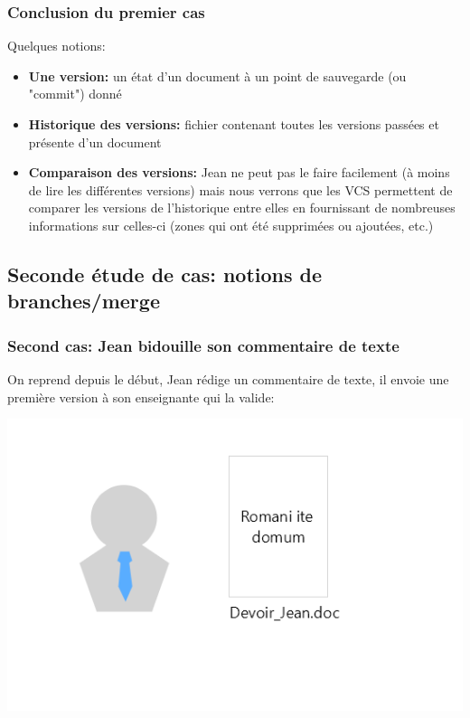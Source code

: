 \documentclass{beamer}
\begin{document}
\begin{frame}
\frametitle{Conclusion du premier cas}
Quelques notions:
\begin{itemize}
    \item \textbf{Une version:} un état d'un document à un point de sauvegarde (ou "commit") donné
    \item \textbf{Historique des versions:} fichier contenant toutes les versions passées et présente d'un document
    \item \textbf{Comparaison des versions:} Jean ne peut pas le faire facilement (à moins de lire les différentes versions) mais nous verrons que les VCS permettent de comparer les versions de l'historique entre elles en fournissant de nombreuses informations sur celles-ci (zones qui ont été supprimées ou ajoutées, etc.)
\end{itemize}
\end{frame}


\subsection{Seconde étude de cas: notions de branches/merge}
\begin{frame}
\frametitle{Second cas: Jean bidouille son commentaire de texte}
On reprend depuis le début, Jean rédige un commentaire de texte, il envoie une première version à son enseignante qui la valide:
\begin{center}
    \includegraphics[scale=0.4]{images/secondScenario/firstScenario_diapo1.png}
\end{center}
\end{frame}
\end{document}
